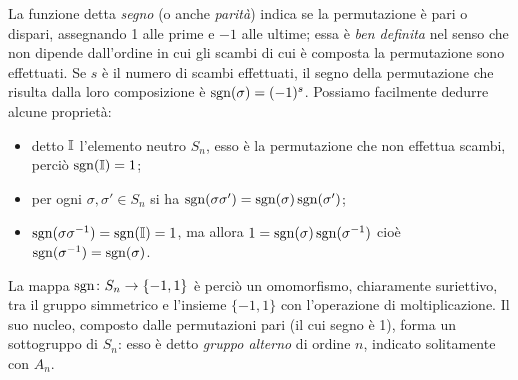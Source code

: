 La funzione detta \emph{segno} (o anche \emph{parità}) indica se la permutazione è pari o dispari, assegnando 1 alle prime e $-1$ alle ultime; essa è \emph{ben definita} nel senso che non dipende dall'ordine in cui gli scambi di cui è composta la permutazione sono effettuati.
Se $s$ è il numero di scambi effettuati, il segno della permutazione che risulta dalla loro composizione è $\operatorname{sgn}(\sigma)=(-1)^s$.
Possiamo facilmente dedurre alcune proprietà:
\begin{itemize}
	\item detto $\mathbb I$ l'elemento neutro $S_n$, esso è la permutazione che non effettua scambi, perciò $\operatorname{sgn}(\mathbb I)=1$;
	\item per ogni $\sigma,\sigma'\in S_n$ si ha $\operatorname{sgn}(\sigma\sigma')=\operatorname{sgn}(\sigma)\operatorname{sgn}(\sigma')$;
	\item $\operatorname{sgn}(\sigma\sigma^{-1})=\operatorname{sgn}(\mathbb I)=1$, ma allora $1=\operatorname{sgn}(\sigma)\operatorname{sgn}(\sigma^{-1})$ cioè $\operatorname{sgn}(\sigma^{-1})=\operatorname{sgn}(\sigma)$.
\end{itemize}
La mappa $\operatorname{sgn}\colon S_n\to\{-1,1\}$ è perciò un omomorfismo, chiaramente suriettivo, tra il gruppo simmetrico e l'insieme $\{-1,1\}$ con l'operazione di moltiplicazione.
Il suo nucleo, composto dalle permutazioni pari (il cui segno è 1), forma un sottogruppo di $S_n$: esso è detto \emph{gruppo alterno} di ordine $n$, indicato solitamente con $A_n$.

